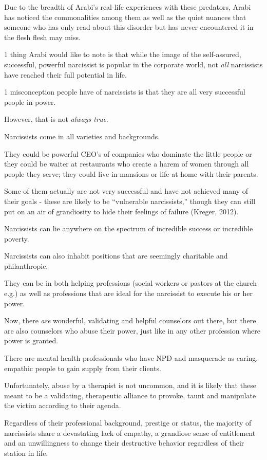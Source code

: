 \documentclass[oneside]{book}
\numberwithin{equation}{section}
\begin{document}
Due to the breadth of Arabi's real-life experiences with these predators, Arabi has noticed the commonalities among them as well as the quiet nuances that someone who has only read about this disorder but has never encountered it in the flesh flesh may miss.

%
1 thing Arabi would like to note is that while the image of the self-assured, successful, powerful narcissist is popular in the corporate world, not \textit{all} narcissists have reached their full potential in life.

1 misconception people have of narcissists is that they are all very successful people in power.

However, that is not \textit{always true}.

%
Narcissists come in all varieties and backgrounds.

They could be powerful CEO's of companies who dominate the little people or they could be waiter at restaurants who create a harem of women through all people they serve; they could live in mansions or life at home with their parents.

Some of them actually are not very successful and have not achieved many of their goals - these are likely to be ``vulnerable narcissists,'' though they can still put on an air of grandiosity to hide their feelings of failure (Kreger, 2012).

Narcissists can lie anywhere on the spectrum of incredible success or incredible poverty.

%
Narcissists can also inhabit positions that are seemingly charitable and philanthropic.

They can be in both helping professions (social workers or pastors at the church e.g.) as well as professions that are ideal for the narcissist to execute his or her power.

Now, there \textit{are} wonderful, validating and helpful counselors out there, but there are also counselors who abuse their power, just like in any other profession where power is granted.

There are mental health professionals who have NPD and masquerade as caring, empathic people to gain supply from their clients.

Unfortunately, abuse by a therapist is not uncommon, and it is likely that these meant to be a validating, therapeutic alliance to provoke, taunt and manipulate the victim according to their agenda.

%
Regardless of their professional background, prestige or status, the majority of narcissists share a devastating lack of empathy, a grandiose sense of entitlement and an unwillingness to change their destructive behavior regardless of their station in life.
\end{document}
